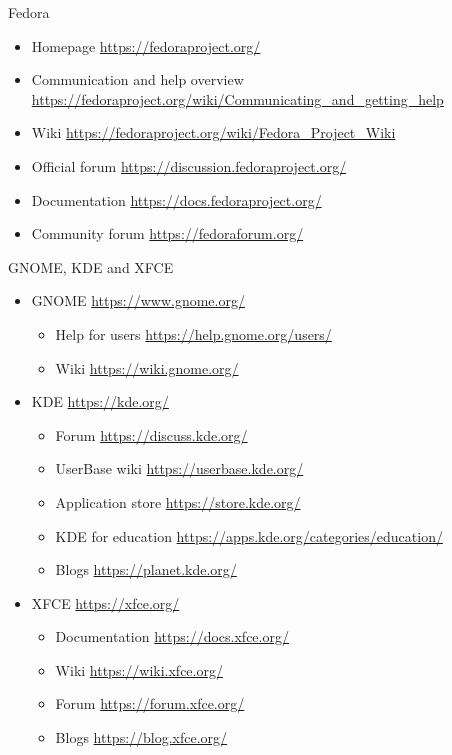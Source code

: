 \documentclass[compress, xelatex, 11pt, xcolor=svgnames, aspectratio=169,
	hyperref={
		bookmarks=true,
		unicode=true,
		colorlinks=true,
		pdftitle={Linux, command line and MetaCentrum},
		plainpages=false,
		pdfauthor={Vojtech Zeisek},
		pdfsubject={Course about use of Linux command line, writing shell scripts and using MetaCentrum of CESNET},
		pdfcreator={XeLaTeX},
		pdfkeywords={Linux, GNU, BASH, shell, command line, MetaCentrum},
		linkcolor=DarkRed, %
		anchorcolor=DarkBlue, %
		citecolor=Indigo, %
		filecolor=NavyBlue, %
		menucolor=DarkMagenta, %
		urlcolor=DarkBlue, %
		},
	url={hyphens, lowtilde} %
	]{beamer}
\begin{document}
\begin{frame}{Fedora}
	\begin{itemize}
		\item Homepage \url{https://fedoraproject.org/}
		\item Communication and help overview \url{https://fedoraproject.org/wiki/Communicating_and_getting_help}
		\item Wiki \url{https://fedoraproject.org/wiki/Fedora_Project_Wiki}
		\item Official forum \url{https://discussion.fedoraproject.org/}
		\item Documentation \url{https://docs.fedoraproject.org/}
		\item Community forum \url{https://fedoraforum.org/}
	\end{itemize}
\end{frame}

\begin{frame}{GNOME, KDE and XFCE}
	\begin{itemize}
		\item GNOME \url{https://www.gnome.org/}
		\begin{itemize}
			\item Help for users \url{https://help.gnome.org/users/}
			\item Wiki \url{https://wiki.gnome.org/}
		\end{itemize}
		\item KDE \url{https://kde.org/}
		\begin{itemize}
			\item Forum \url{https://discuss.kde.org/}
			\item UserBase wiki \url{https://userbase.kde.org/}
			\item Application store \url{https://store.kde.org/}
			\item KDE for education \url{https://apps.kde.org/categories/education/}
			\item Blogs \url{https://planet.kde.org/}
		\end{itemize}
		\item XFCE \url{https://xfce.org/}
		\begin{itemize}
			\item Documentation \url{https://docs.xfce.org/}
			\item Wiki \url{https://wiki.xfce.org/}
			\item Forum \url{https://forum.xfce.org/}
			\item Blogs \url{https://blog.xfce.org/}
		\end{itemize}
	\end{itemize}
\end{frame}
\end{document}
